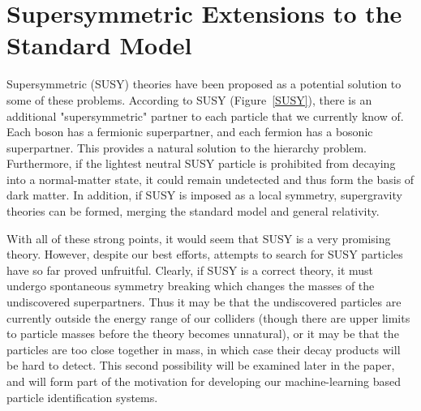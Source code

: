 \chapter{Supersymmetric Extensions to the Standard Model}

Supersymmetric (SUSY) theories have been proposed as a potential solution to some of these problems. According to SUSY (Figure~\ref{SUSY}), there is an additional "supersymmetric" partner to each particle that we currently know of. Each boson has a fermionic superpartner, and each fermion has a bosonic superpartner. This provides a natural solution to the hierarchy problem. Furthermore, if the lightest neutral SUSY particle is prohibited from decaying into a normal-matter state, it could remain undetected and thus form the basis of dark matter. In addition, if SUSY is imposed as a local symmetry, supergravity theories can be formed, merging the standard model and general relativity.

With all of these strong points, it would seem that SUSY is a very promising theory. However, despite our best efforts, attempts to search for SUSY particles have so far proved unfruitful. Clearly, if SUSY is a correct theory, it must undergo spontaneous symmetry breaking which changes the masses of the undiscovered superpartners. Thus it may be that the undiscovered particles are currently outside the energy range of our colliders (though there are upper limits to particle masses before the theory becomes unnatural), or it may be that the particles are too close together in mass, in which case their decay products will be hard to detect. This second possibility will be examined later in the paper, and will form part of the motivation for developing our machine-learning based particle identification systems.